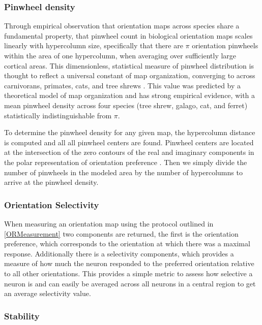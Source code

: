 \subsubsection{Pinwheel density}

Through empirical observation that orientation maps across species
share a fundamental property, that pinwheel count in biological
orientation maps scales linearly with hypercolumn size, specifically
that there are $\pi$ orientation pinwheels within the area of one
hypercolumn, when averaging over sufficiently large cortical
areas. This dimensionless, statistical measure of pinwheel
distribution is thought to reflect a universal constant of map
organization, converging to across carnivorans, primates, cats, and
tree shrews \citep{Kaschube2010, Keil2012}. This value was predicted
by a theoretical model of map organization and has strong empirical
evidence, with a mean pinwheel density across four species (tree
shrew, galago, cat, and ferret) statistically indistinguishable from
$\pi$.

To determine the pinwheel density for any given map, the hypercolumn
distance is computed and all all pinwheel centers are found. Pinwheel
centers are located at the intersection of the zero contours of the
real and imaginary components in the polar representation of
orientation preference \citep{Lowel1998}. Then we simply divide the
number of pinwheels in the modeled area by the number of hypercolumns
to arrive at the pinwheel density.

\subsubsection{Orientation Selectivity}

When measuring an orientation map using the protocol outlined in
\ref{ORMeasurement} two components are returned, the first is the
orientation preference, which corresponds to the orientation at which
there was a maximal response. Additionally there is a selectivity
components, which provides a measure of how much the neuron responded
to the preferred orientation relative to all other orientations. This
provides a simple metric to assess how selective a neuron is and can
easily be averaged across all neurons in a central region to get an
average selectivity value.

\subsubsection{Stability}

